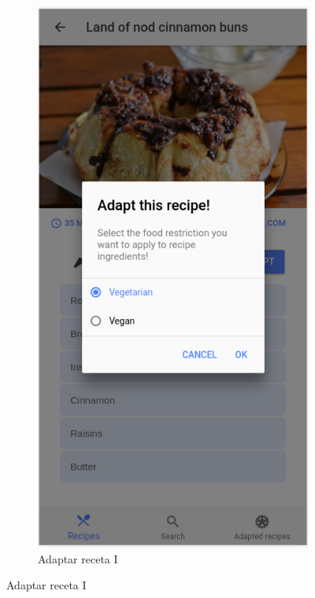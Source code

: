 \begin{figure}[H]
    \centering
    \begin{subfigure}[b]{0.32\linewidth}
        \includegraphics[width=\linewidth]{imagenes/app/pantallas/app_7.png}
        \caption{Adaptar receta I}

\end{subfigure}
\end{figure}
